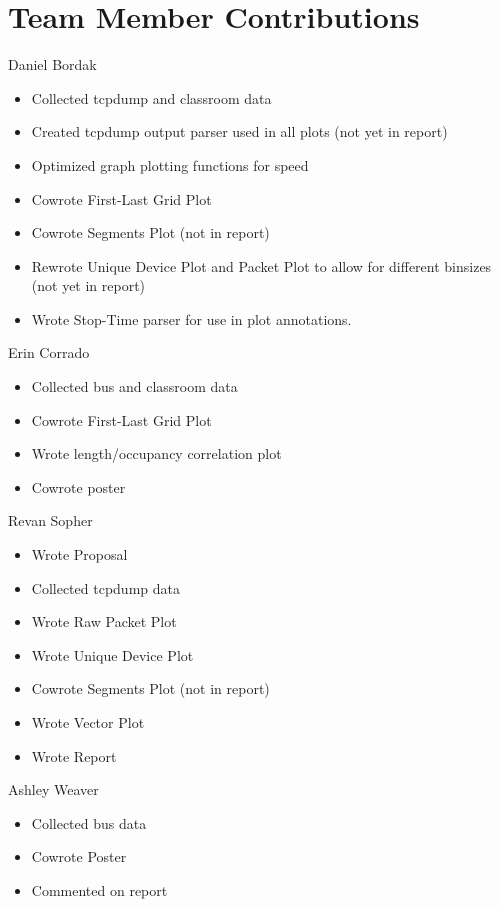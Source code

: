 \documentclass[letterpaper,abstract=on,titlepage=false]{scrreprt}
\begin{document}
\chapter*{Team Member Contributions}
Daniel Bordak
\begin{itemize}
  \item Collected tcpdump and classroom data
  \item Created tcpdump output parser used in all plots (not yet in report)
  \item Optimized graph plotting functions for speed
  \item Cowrote First-Last Grid Plot
  \item Cowrote Segments Plot (not in report)
  \item Rewrote Unique Device Plot and Packet Plot to allow for different binsizes (not yet in report)
  \item Wrote Stop-Time parser for use in plot annotations.
\end{itemize}
Erin Corrado
\begin{itemize}
  \item Collected bus and classroom data
  \item Cowrote First-Last Grid Plot
  \item Wrote length/occupancy correlation plot
  \item Cowrote poster
\end{itemize}
Revan Sopher
\begin{itemize}
  \item Wrote Proposal
  \item Collected tcpdump data
  \item Wrote Raw Packet Plot
  \item Wrote Unique Device Plot
  \item Cowrote Segments Plot (not in report)
  \item Wrote Vector Plot
  \item Wrote Report
\end{itemize}
Ashley Weaver
\begin{itemize}
  \item Collected bus data
  \item Cowrote Poster
  \item Commented on report
\end{itemize}
\end{document}
